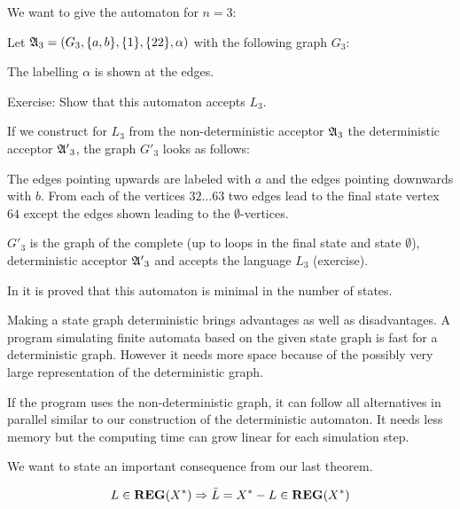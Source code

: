 We want to give the automaton for $n = 3$:

Let $\mbox{$\mathfrak{A}$}_3 = (G_3, \mbox{$\{a,b\}$}, \mbox{$\{1\}$}, \mbox{$\{22\}$}, \alpha)$ with the
following graph $G_3$:

\begin{center}

\end{center}

The labelling $\alpha$ is shown at the edges.

Exercise: Show that this automaton accepts $L_3$.

If we construct for $L_3$ from the non-deterministic acceptor $\mbox{$\mathfrak{A}$}_3$
the deterministic acceptor $\mbox{$\mathfrak{A'}$}_3$, the graph $G'_3$ looks as follows:

\begin{center}
\begin{tiny}

\end{tiny}
\end{center}

The edges pointing upwards are labeled with $a$ and the edges pointing downwards
with $b$. From each of the vertices $32 \ldots 63$ two edges lead to the final
state vertex $64$ except the edges shown leading to the $\emptyset$-vertices.

$G'_3$ is the graph of the complete (up to loops in the final state and state
$\emptyset$), deterministic acceptor $\mbox{$\mathfrak{A'}$}_3$ and accepts the language $L_3$
(exercise).

In \cite{Commentz} it is proved that this automaton is minimal in the number of
states.

Making a state graph deterministic brings advantages as well as disadvantages. A
program simulating finite automata based on the given state graph is fast for
a deterministic graph. However it needs more space because of the possibly very
large representation of the deterministic graph.

If the program uses the non-deterministic graph, it can follow all alternatives
in parallel similar to our construction of the deterministic automaton. It needs
less memory but the computing time can grow linear for each simulation step.

We want to state an important consequence from our last theorem.

\begin{theorem}
\[ L \in \mbox{{\bf REG}}(X^*) \Rightarrow \bar{L} = X^* - L \in \mbox{{\bf REG}}(X^*) \]
\end{theorem}

